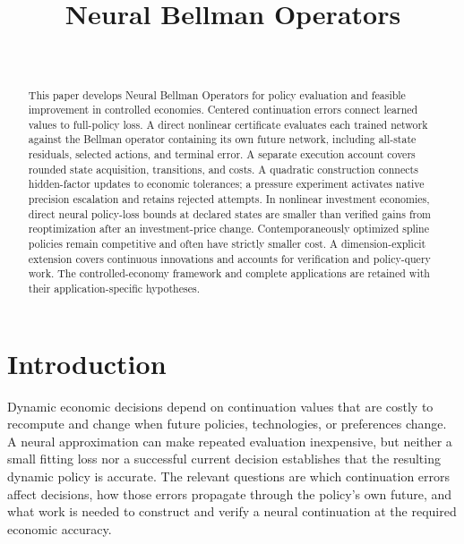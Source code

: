\documentclass[ecta,nameyear,draft]{econsocart}
\theoremstyle{definition}
\theoremstyle{remark}
\begin{document}
\begin{frontmatter}
\title{Neural Bellman Operators}
\begin{aug}
\author[id=au1,addressref={add1}]{~}
\address[id=add1]{Peking University}
\end{aug}
\begin{abstract}
This paper develops Neural Bellman Operators for policy evaluation and feasible improvement in controlled economies. Centered continuation errors connect learned values to full-policy loss. A direct nonlinear certificate evaluates each trained network against the Bellman operator containing its own future network, including all-state residuals, selected actions, and terminal error. A separate execution account covers rounded state acquisition, transitions, and costs. A quadratic construction connects hidden-factor updates to economic tolerances; a pressure experiment activates native precision escalation and retains rejected attempts. In nonlinear investment economies, direct neural policy-loss bounds at declared states are smaller than verified gains from reoptimization after an investment-price change. Contemporaneously optimized spline policies remain competitive and often have strictly smaller cost. A dimension-explicit extension covers continuous innovations and accounts for verification and policy-query work. The controlled-economy framework and complete applications are retained with their application-specific hypotheses.
\end{abstract}
\begin{keyword}
\end{keyword}
\end{frontmatter}
\section{Introduction}\label{sec:r37intro}
Dynamic economic decisions depend on continuation values that are costly to
recompute and change when future policies, technologies, or preferences
change. A neural approximation can make repeated evaluation inexpensive, but
neither a small fitting loss nor a successful current decision establishes
that the resulting dynamic policy is accurate. The relevant questions are
which continuation errors affect decisions, how those errors propagate
through the policy's own future, and what work is needed to construct and
verify a neural continuation at the required economic accuracy.
\end{document}
